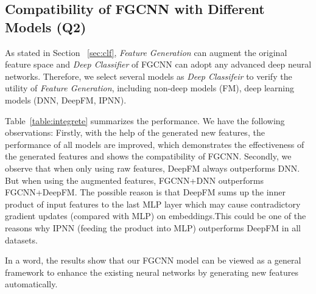 \subsection{Compatibility of FGCNN with Different Models (Q2)}

As stated in Section ~\ref{sec:clf}, \emph{Feature Generation}  can augment the original feature space and \emph{Deep Classifier} of FGCNN can adopt any advanced deep neural networks. Therefore, we select several models  as \emph{Deep Classifeir} to verify the utility of \emph{Feature Generation}, including non-deep models (FM), deep learning models (DNN, DeepFM, IPNN).

Table~\ref{table:integrete} summarizes the performance. We have the following observations: Firstly, with the help of the generated new features, the performance of all models are improved, which demonstrates the effectiveness of the generated features and shows the compatibility of FGCNN. Secondly, we observe that when only using raw features, DeepFM always outperforms DNN. But when using the augmented features, FGCNN+DNN outperforms FGCNN+DeepFM. The possible reason is that DeepFM sums up the inner product of input features to the last MLP layer which may cause contradictory gradient updates (compared with MLP) on embeddings.This could be one of the reasons why IPNN (feeding the product into MLP) outperforms DeepFM in all datasets.

In a word, the results show that our FGCNN model can be viewed as a general framework to enhance the existing neural networks by generating new features automatically.

